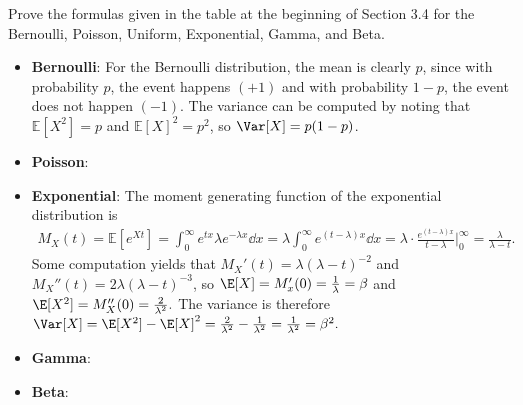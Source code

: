 \documentclass[a4paper]{article}
\begin{document}
\begin{Exercise}
	Prove the formulas given in the table at the beginning of Section 3.4 for the Bernoulli, Poisson, Uniform, Exponential, Gamma, and Beta.
\end{Exercise}
\begin{Solution}
\begin{itemize}
	\item \textbf{Bernoulli}: For the Bernoulli distribution, the mean is clearly $p$, since with probability $p$, the event happens $(+1)$ and with probability $1 - p$, the event does not happen $(-1)$. The variance can be computed by noting that $\mathbb{E}[X^2] = p$ and $\mathbb{E}[X]^2 = p^2$, so $\Var[X] = p (1 - p)$.
	\item \textbf{Poisson}: 
	\item \textbf{Exponential}: The moment generating function of the exponential distribution is 
	\begin{align*}
		M_X(t) = \mathbb{E}[e^{Xt}] = \int_0^{\infty} e^{tx} \lambda e^{-\lambda x} \dd x = \lambda \int_0^{\infty} e^{(t - \lambda) x} \dd x = \lambda \cdot \frac{e^{(t - \lambda)x}}{t - \lambda} \Big|_0^{\infty} = \frac{\lambda}{\lambda - t}.
	\end{align*}
	Some computation yields that $M_X'(t) = \lambda (\lambda - t)^{-2}$ and $M_X''(t)= 2\lambda (\lambda - t)^{-3}$, so $\E[X] = M_x'(0) = \frac{1}{\lambda} = \beta$ and $\E[X^2] = M_X''(0) = \frac{2}{\lambda^2}.$ The variance is therefore $\Var[X] = \E[X^2]- \E[X]^2 = \frac{2}{\lambda^2} - \frac{1}{\lambda^2}= \frac{1}{\lambda^2} = \beta^2.$
	\item \textbf{Gamma}:
	\item \textbf{Beta}: 
\end{itemize}
\end{Solution}
\end{document}
